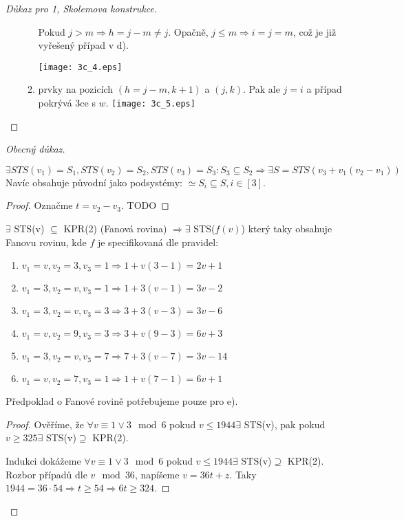 \begin{proof}[Důkaz pro 1, Skolemova konstrukce]
\begin{enumerate}
\begin{enumerate}
					Pokud $j > m \Rightarrow h = j - m \ne j$.
					Opačně, $j \leq m \Rightarrow i = j = m$, což je již vyřešený případ v d).

				\texttt{[image: 3c\_4.eps]}
				\item prvky na pozicích $(h = j - m, k + 1)$ a $(j, k)$.
					Pak ale $j = i$ a případ pokrývá 3ce s $w$.
				\texttt{[image: 3c\_5.eps]}
			\end{enumerate}
	\end{enumerate}

\end{proof}

\begin{proof}[Obecný  důkaz]
	\begin{lemma}
		$\exists STS(v_1) = S_1, STS(v_2) = S_2, STS(v_3) = S_3: S_3 \subseteq S_2 \Rightarrow \exists S = STS(v_3 + v_1(v_2 - v_1)) $
		Navíc obsahuje původní jako podsystémy: $ \simeq S_i \subseteq S, i \in [3]$.
	\end{lemma}
	\begin{proof}
		Označme $t = v_2 - v_3$.
    		TODO
	\end{proof}

	\begin{lemma}
		$\exists$ STS(v) $\subseteq$ KPR(2) (Fanová rovina) $\Rightarrow \exists$ STS($f(v)$) který taky obsahuje Fanovu rovinu, kde $f$ je specifikovaná dle pravidel:
		\begin{enumerate}[label=\alph*)]
			\item $v_1 = v, v_2 = 3, v_3 = 1 \Rightarrow 1 + v (3 - 1) = 2v + 1$
			\item $v_1 = 3, v_2 = v, v_3 = 1 \Rightarrow 1 + 3(v - 1) = 3v - 2$
			\item $v_1 = 3, v_2 = v, v_3 = 3 \Rightarrow 3 + 3(v - 3) = 3v - 6$
			\item $v_1 = v, v_2 = 9, v_3 = 3 \Rightarrow 3 + v(9 - 3) = 6v + 3$
			\item $v_1 = 3, v_2 = v, v_3 = 7 \Rightarrow 7 + 3 (v - 7) = 3v - 14$
			\item $v_1 = v, v_2 = 7, v_3 = 1 \Rightarrow 1 + v(7 - 1) = 6v + 1$
		\end{enumerate}
		Předpoklad o Fanové rovině potřebujeme pouze pro e).
	\end{lemma}
	\begin{proof}
		Ověříme, že $\forall v \equiv 1 \lor 3 \mod6$ pokud $v \leq 1944 \exists$ STS(v), pak pokud $v \geq 325 \exists$ STS(v)$\supseteq$ KPR(2).

		Indukci dokážeme $\forall v \equiv 1 \lor 3 \mod6$ pokud $v \leq 1944 \exists$ STS(v)$\supseteq$ KPR(2).
		Rozbor případů dle $v \mod36$, napíšeme $v = 36t + z$.
		Taky $1944 = 36 \cdot 54 \Rightarrow t \geq 54 \Rightarrow 6t \geq 324$.


	\end{proof}
\end{proof}
